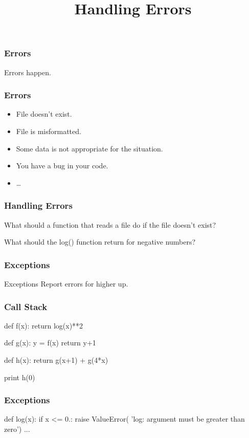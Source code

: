 
\title{Handling Errors}

\frame{\maketitle}

\begin{frame}[fragile]
\frametitle{Errors}
Errors happen.
\end{frame}

\begin{frame}[fragile]
\frametitle{Errors}

\begin{itemize}
\item File doesn't exist.
\item File is misformatted.
\item Some data is not appropriate for the situation.
\item You have a bug in your code.
\item \ldots
\end{itemize}

\end{frame}

\begin{frame}[fragile]
\frametitle{Handling Errors}

What should a function that reads a file do if the file doesn't exist?

What should the log() function return for negative numbers?
\end{frame}

\begin{frame}[fragile]
\frametitle{Exceptions}

\begin{block}{Exceptions}
Report errors for higher up.
\end{block}

\end{frame}

\begin{frame}[fragile]
\frametitle{Call Stack}
\begin{python}
def f(x):
    return log(x)**2

def g(x):
    y = f(x)
    return y+1

def h(x):
    return g(x+1) + g(4*x)

print h(0)
\end{python}
\end{frame}

\begin{frame}[fragile]
\frametitle{Exceptions}

\begin{python}
def log(x):
    if x <= 0.:
        raise ValueError(
            'log: argument must be greater than zero')
    ...
\end{python}
\end{frame}

